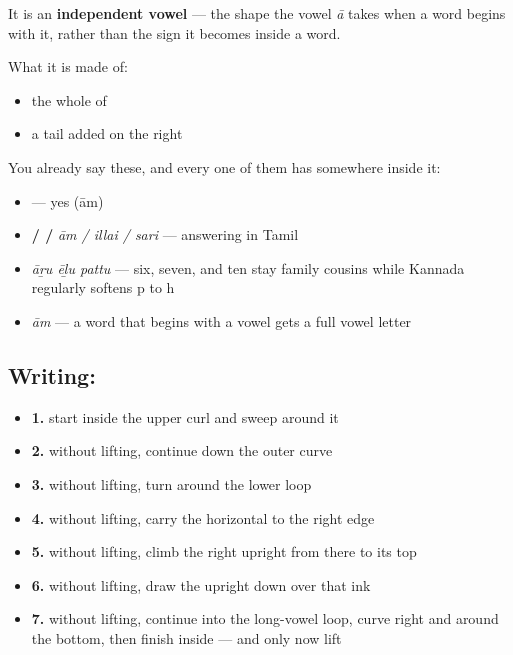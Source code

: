 It is an \textbf{independent vowel} — the shape the vowel \emph{ā} takes when a word begins with it, rather than the sign it becomes inside a word.

What it is made of:

\begin{itemize}
\raggedright
  \item the whole of 
  \item a tail added on the right
\end{itemize}

You already say these, and every one of them has  somewhere inside it:

\begin{itemize}
\raggedright
  \item \textbf{} — yes (ām)
  \item \textbf{ /  / } \emph{ām / illai / sari} — answering in Tamil
  \item \textbf{  } \emph{āṟu ēḻu pattu} — six, seven, and ten stay family cousins while Kannada regularly softens p to h
  \item \textbf{} \emph{ām} — a word that begins with a vowel gets a full vowel letter
\end{itemize}

\subsection*{Writing: }

\begin{itemize}
\raggedright
  \item \textbf{1.} start inside the upper curl and sweep around it
  \item \textbf{2.} without lifting, continue down the outer curve
  \item \textbf{3.} without lifting, turn around the lower loop
  \item \textbf{4.} without lifting, carry the horizontal to the right edge
  \item \textbf{5.} without lifting, climb the right upright from there to its top
  \item \textbf{6.} without lifting, draw the upright down over that ink
  \item \textbf{7.} without lifting, continue into the long-vowel loop, curve right and around the bottom, then finish inside — and only now lift
\end{itemize}

